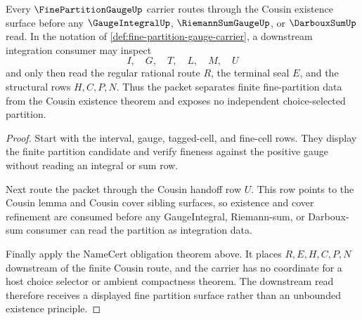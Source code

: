 \begin{theorem}
\label{thm:fine-partition-gauge-cousin-route}
Every $\FinePartitionGaugeUp$ carrier routes through the Cousin existence surface before any $\GaugeIntegralUp$, $\RiemannSumGaugeUp$, or $\DarbouxSumUp$ read. In the notation of \autoref{def:fine-partition-gauge-carrier}, a downstream integration consumer may inspect
$$
I,\quad G,\quad T,\quad L,\quad M,\quad U
$$
and only then read the regular rational route $R$, the terminal seal $E$, and the structural rows $H,C,P,N$. Thus the packet separates finite fine-partition data from the Cousin existence theorem and exposes no independent choice-selected partition.
\end{theorem}
\begin{proof}
Start with the interval, gauge, tagged-cell, and fine-cell rows. They display the finite partition candidate and verify fineness against the positive gauge without reading an integral or sum row.

Next route the packet through the Cousin handoff row $U$. This row points to the Cousin lemma and Cousin cover sibling surfaces, so existence and cover refinement are consumed before any GaugeIntegral, Riemann-sum, or Darboux-sum consumer can read the partition as integration data.

Finally apply the NameCert obligation theorem above. It places $R,E,H,C,P,N$ downstream of the finite Cousin route, and the carrier has no coordinate for a host choice selector or ambient compactness theorem. The downstream read therefore receives a displayed fine partition surface rather than an unbounded existence principle.
\end{proof}




